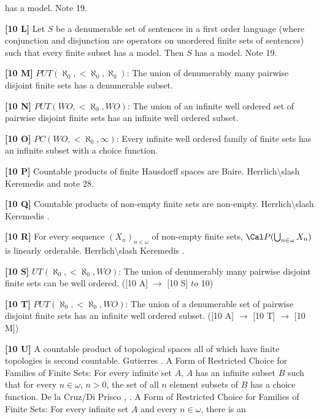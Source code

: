 has a model. Note 19.
\smallskip
\item{}{\bf [10 L]}  Let $S$ be a denumerable set of sentences in a first
order language (where conjunction and disjunction are
operators on unordered finite sets of sentences) such that every
finite subset has a model.  Then $S$ has a model. Note 19.
\smallskip
\item{}{\bf [10 M]} $PUT(\aleph_0,<\aleph_0,\aleph_0)$: The union of
denumerably many pairwise disjoint finite sets has a denumerable
subset.
\smallskip
\item{}{\bf [10 N]} $PUT(WO,<\aleph_0,WO)$: The union of an infinite well
ordered set of pairwise disjoint finite sets has an infinite well
ordered subset.
\smallskip
\item{}{\bf [10 O]} $PC(WO,<\aleph_0,\infty)$: Every infinite well
ordered family of  finite sets has an infinite subset with a
choice function.
\smallskip
\item{}{\bf [10 P]} Countable products of finite Hausdorff spaces
are Baire. \ac{Herrlich\slash Keremedis} \cite{1999b} and note 28.
\smallskip
\item{}{\bf [10 Q]} Countable products of non-empty finite sets are
non-empty. \ac{Herrlich\slash Keremedis} \cite{1999b}.
\smallskip
\item{}{\bf [10 R]} For every sequence $(X_n)_{n\in\omega}$ of non-empty
finite sets, $\Cal P(\bigcup_{n\in\omega}X_n)$ is linearly orderable.
\ac{Herrlich\slash Keremedis} \cite{1999b}.
\smallskip
\item{}{\bf [10 S]}  $UT(\aleph_{0},<\aleph_{0},WO)$:  The
union of denumerably many pairwise disjoint finite sets can be well ordered. ([10 A]
$\to$ [10 S] $to$ 10)
\smallskip
\item{}{\bf [10 T]} $PUT(\aleph_0,<\aleph_0,WO)$: The union of a
denumerable set of pairwise disjoint finite sets has an infinite well ordered subset.
([10 A] $\to$ [10 T] $\to$ [10 M])
\smallskip
\item{}{\bf [10 U]} A countable product of topological spaces all of which
have finite topologies is second countable.  \ac{Gutierres} \cite{2004}.
\medskip
{}  A Form of Restricted Choice for Families of
Finite Sets:
For every infinite set $A$, $A$ has an infinite subset $B$ such
that for every $n\in\omega$, $n>0$, the set of all $n$ element subsets
of $B$ has a choice function. 
\ac{De la Cruz/Di Prisco} \cite{1998a}, \cite{1998b}.
\medskip
{} A Form of
Restricted Choice for Families of Finite Sets:
For every infinite set $A$ and every $n\in\omega$, there is an
